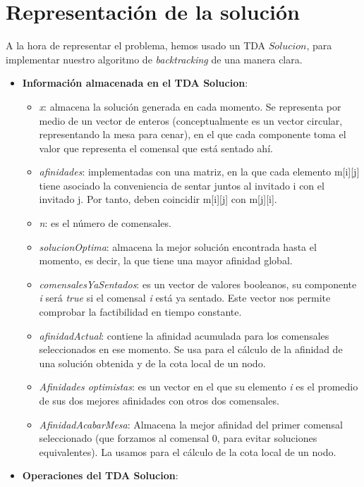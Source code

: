 \documentclass{article}
\begin{document}
	\section{Representación de la solución}
	A la hora de representar el problema, hemos usado un TDA $Solucion$, para implementar nuestro algoritmo de \textit{backtracking} de una manera clara.
	\begin{itemize}
		\item \textbf{Información almacenada en el TDA Solucion}:
		\begin{itemize}
			\item \textit {x}: almacena la solución generada en cada momento. Se representa por medio de un vector de enteros (conceptualmente es un vector circular, representando la mesa para cenar), en el que cada componente toma el valor que representa el comensal que está sentado ahí.
			\item \textit{afinidades}: implementadas con una matriz, en la que cada elemento m[i][j] tiene asociado la conveniencia de sentar juntos al invitado i con el invitado j. Por tanto, deben coincidir m[i][j] con m[j][i].
			\item \textit {n}: es el número de comensales.
			\item \textit {solucionOptima}: almacena la mejor solución encontrada hasta el momento, es decir, la que tiene una mayor afinidad global.
			\item \textit {comensalesYaSentados}: es un vector de valores booleanos, su componente \textit{i} será \textit{true} si el comensal \textit{i} está ya sentado. Este vector nos permite comprobar la factibilidad en tiempo constante.
			\item \textit {afinidadActual}: contiene la afinidad acumulada para los comensales seleccionados en ese momento. Se usa para el cálculo de la afinidad de una solución obtenida y de la cota local de un nodo.
			\item \textit {Afinidades optimistas}: es un vector en el que su elemento \textit{i} es el promedio de sus dos mejores afinidades con otros dos comensales.
			\item \textit {AfinidadAcabarMesa}: Almacena la mejor afinidad del primer comensal seleccionado (que forzamos al comensal 0, para evitar soluciones equivalentes). La usamos para el cálculo de la cota local de un nodo.
		\end{itemize}
		\item \textbf{Operaciones del TDA Solucion}:
		\begin{itemize}

\end{itemize}
\end{itemize}
\end{document}
